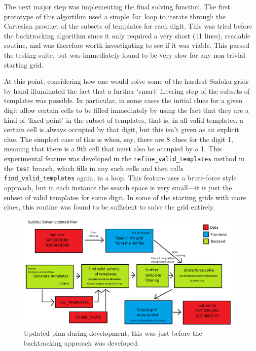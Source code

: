 \documentclass[12pt]{article}
\begin{document}
The next major step was implementing the final solving function.
The first prototype of this algortihm used a simple \texttt{for} loop to iterate through the Cartesian product of the subsets of templates for each digit.
This was tried before the backtracking algorithm since it only required a very short (11 lines), readable routine, and was therefore worth investigating to see if it was viable.
This passed the testing suite, but was immediately found to be very slow for any non-trivial starting grid.

At this point, considering how one would solve some of the hardest Sudoku grids by hand illuminated the fact that a further `smart' filtering step of the subsets of templates was possible.
In particular, in some cases the initial clues for a given digit allow certain cells to be filled immediately by using the fact that they are a kind of 'fixed point' in the subset of templates, that is, in all valid templates, a certain cell is always occupied by that digit, but this isn't given as an explicit clue.
The simplest case of this is when, say, there are 8 clues for the digit 1, meaning that there is a 9th cell that must also be occupied by a 1.
This experimental feature was developed in the \texttt{refine\_valid\_templates} method in the \texttt{test} branch, which fills in any such cells and then calls \texttt{find\_valid\_templates} again, in a loop.
This feature uses a brute-force style approach, but in each instance the search space is very small---it is just the subset of valid templates for some digit.
In some of the starting grids with more clues, this routine was found to be sufficient to solve the grid entirely.

\begin{figure}[hbt]
    \includegraphics[scale=0.23]{sudokuplan2.png}
    \caption{Updated plan during development; this was just before the backtracking approach was developed.}
    \label{plan2}
\end{figure}
\end{document}
